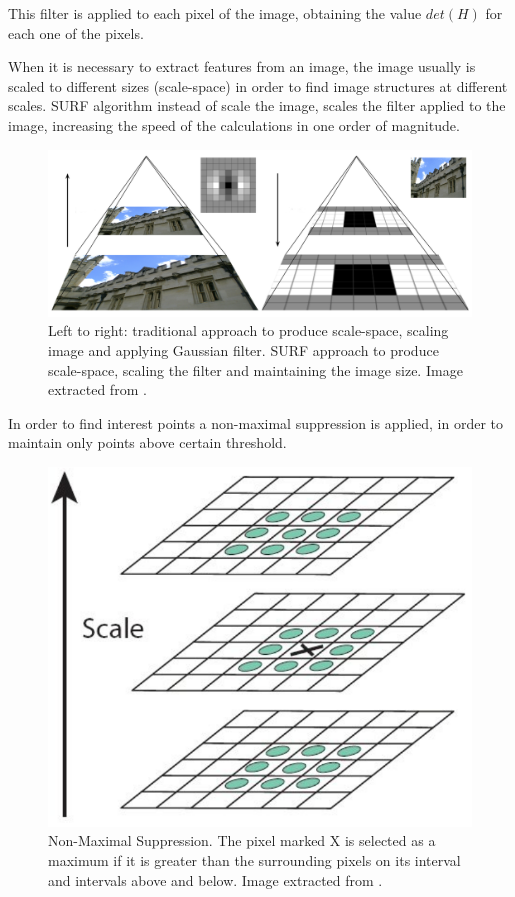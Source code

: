 This filter is applied to each pixel of the image, obtaining the value $det(H)$ for each one of the pixels. 

When it is necessary to extract features from an image, the image  usually is scaled to different sizes (scale-space) in order 
to find image structures 
at different scales. SURF algorithm instead of scale the image, scales the filter applied to the 
image, increasing the speed of the calculations in one order of magnitude.

\begin{figure}[!h]
\begin{center}
\includegraphics[scale=0.35]{images/surf_scale}
\caption{Left to right: traditional approach to produce scale-space, scaling image and applying Gaussian filter. SURF approach to produce scale-space, scaling the filter and maintaining the image size. Image extracted from \cite{miguel}.}
\end{center}
\end{figure}


In order to find interest points a non-maximal suppression is applied, in order to maintain only points above certain threshold. 

\begin{figure}[H]
\begin{center}
\includegraphics[scale=0.28]{images/surf_nb}
\caption{Non-Maximal Suppression. The pixel marked X is selected as a maximum if it is greater than the 
surrounding pixels on its interval and intervals above and below. Image extracted from \cite{OpenSURF}.}
\end{center}
\end{figure}

